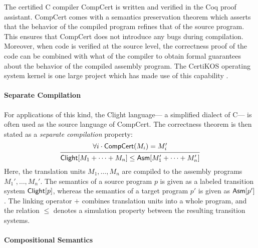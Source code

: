 \documentclass[sigplan,10pt,authordraft]{acmart}
\begin{document}
The certified C compiler CompCert \cite{compcert} is
written and verified in the Coq proof assistant.
CompCert comes with a semantics preservation theorem
which asserts that
the behavior of the compiled program
refines that of the source program.
This ensures that CompCert does not introduce any bugs
during compilation.
Moreover,
when code is verified at the source level,
the correctness proof of the code
can be combined with what of the compiler
to obtain formal guarantees
about the behavior of the compiled assembly program.
The CertiKOS operating system kernel
is one large project
which has made use of this capability \cite{popl15}.

\paragraph{Separate Compilation} %

For applications of this kind,
the Clight language---%
a simplified dialect of C---%
is often used as the source language of CompCert.
The correctness theorem is then stated as
a \emph{separate compilation} \cite{sepcompcert} property:
\begin{equation} \label{eqn:scc}
  \begin{prooftree}
    \hypo{\forall i \cdot \kw{CompCert}(M_i) = M_i'}
    \infer1{\kw{Clight}[M_1 + \cdots + M_n]
      \le \kw{Asm}[M_1' + \cdots + M_n']}
  \end{prooftree}
\end{equation}
Here,
the translation units $M_1, \ldots, M_n$
are compiled to the assembly programs $M_1', \ldots, M_n'$.
The semantics of a source program $p$
is given as a labeled transition system $ \mathsf{Clight} [p]$,
whereas the semantics of a target program $p'$
is given as $ \mathsf{Asm} [p']$.
The linking operator $+$
combines translation units into a whole program,
and the relation $\le$ denotes a simulation property
between the resulting transition systems.


\paragraph{Compositional Semantics} %
\end{document}
